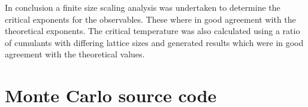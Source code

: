 \documentclass[a4paper]{article}
\begin{document}
In conclusion a finite size scaling analysis was undertaken to determine the critical
exponents for the observables. These where in good agreement with the 
theoretical exponents. The critical temperature was also calculated using a
ratio of cumulants with differing lattice sizes and generated results which were in good agreement with the theoretical values. 
% 
% 
% 
% 

\nocite{Binder}
\nocite{Landau:76}
\nocite{Swendsen:87}
\nocite{Cardy}
\nocite{NumRecipe}
\nocite{Kinzel}
\nocite{Giordano}
\nocite{Hoffmann}
\nocite{Yeomans}
\nocite{Reichel}


\setlength{\oddsidemargin}{0cm}
\setlength{\evensidemargin}{0cm}
\setlength{\hoffset}{-0.5in}
\setlength{\voffset}{-0.5in}
\setlength{\marginparwidth}{0cm}
\setlength{\textwidth}{18.5cm}
\appendix
\section{Monte Carlo source code}
\begin{figure}[H]
\end{figure}
\end{document}
